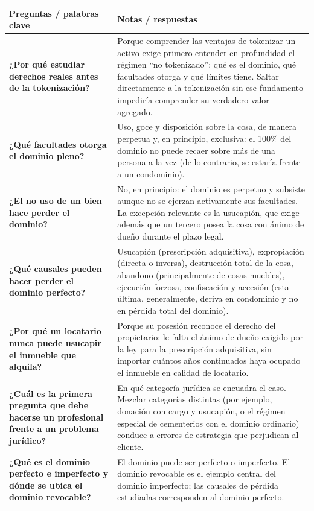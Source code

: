 \documentclass[12pt,oneside]{book}
\newlength{\cornellL}
\newlength{\cornellR}
\newcommand{\cornellrow}[2]{\textbf{#1} & #2 \\[0.3em] \midrule[0.3pt]}
\newcommand{\cornelllastrow}[2]{\textbf{#1} & #2 \\[0.3em]}
\begin{document}
\begingroup
\renewcommand{\arraystretch}{1.25}
\begin{longtable}{@{}>{\RaggedRight\arraybackslash}p{\cornellL}>{\RaggedRight\arraybackslash}p{\cornellR}@{}}
\toprule
\textbf{Preguntas / palabras clave} & \textbf{Notas / respuestas} \\
\midrule
\endhead

\cornellrow{¿Por qué estudiar derechos reales antes de la tokenización?}{Porque comprender las ventajas de tokenizar un activo exige primero entender en profundidad el régimen ``no tokenizado'': qué es el dominio, qué facultades otorga y qué límites tiene. Saltar directamente a la tokenización sin ese fundamento impediría comprender su verdadero valor agregado.}

\cornellrow{¿Qué facultades otorga el dominio pleno?}{Uso, goce y disposición sobre la cosa, de manera perpetua y, en principio, exclusiva: el 100\% del dominio no puede recaer sobre más de una persona a la vez (de lo contrario, se estaría frente a un condominio).}

\cornellrow{¿El no uso de un bien hace perder el dominio?}{No, en principio: el dominio es perpetuo y subsiste aunque no se ejerzan activamente sus facultades. La excepción relevante es la usucapión, que exige además que un tercero posea la cosa con ánimo de dueño durante el plazo legal.}

\cornellrow{¿Qué causales pueden hacer perder el dominio perfecto?}{Usucapión (prescripción adquisitiva), expropiación (directa o inversa), destrucción total de la cosa, abandono (principalmente de cosas muebles), ejecución forzosa, confiscación y accesión (esta última, generalmente, deriva en condominio y no en pérdida total del dominio).}

\cornellrow{¿Por qué un locatario nunca puede usucapir el inmueble que alquila?}{Porque su posesión reconoce el derecho del propietario: le falta el ánimo de dueño exigido por la ley para la prescripción adquisitiva, sin importar cuántos años continuados haya ocupado el inmueble en calidad de locatario.}

\cornellrow{¿Cuál es la primera pregunta que debe hacerse un profesional frente a un problema jurídico?}{En qué categoría jurídica se encuadra el caso. Mezclar categorías distintas (por ejemplo, donación con cargo y usucapión, o el régimen especial de cementerios con el dominio ordinario) conduce a errores de estrategia que perjudican al cliente.}

\cornelllastrow{¿Qué es el dominio perfecto e imperfecto y dónde se ubica el dominio revocable?}{El dominio puede ser perfecto o imperfecto. El dominio revocable es el ejemplo central del dominio imperfecto; las causales de pérdida estudiadas corresponden al dominio perfecto.}


\end{longtable}
\end{document}
